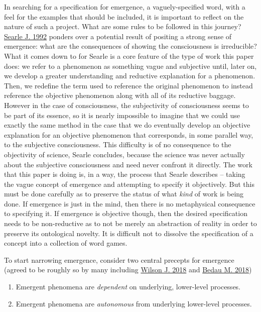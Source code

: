 \documentclass{article}
\newcommand{\ti}[1]{\textit{#1}}
\renewcommand{\cite}[1]{\hyperlink{#1}{#1}}
\begin{document}
In searching for a specification for emergence, a vaguely-specified word, with a feel for the examples that should be included, it is important to reflect on the nature of such a project. What are some rules to be followed in this journey? \cite{Searle J. 1992} ponders over a potential result of positing a strong sense of emergence: what are the consequences of showing the consciousness is irreducible? What it comes down to for Searle is a core feature of the type of work this paper does: we refer to a phenomenon as something vague and subjective until, later on, we develop a greater understanding and reductive explanation for a phenomenon. Then, we redefine the term used to reference the original phenomenon to instead reference the objective phenomenon along with all of its reductive baggage. However in the case of consciousness, the subjectivity of consciousness seems to be part of its essence, so it is nearly impossible to imagine that we could use exactly the same method in the case that we do eventually develop an objective explanation for an objective phenomenon that corresponds, in some parallel way, to the subjective consciousness. This difficulty is of no consequence to the objectivity of science, Searle concludes, because the science was never actually about the subjective consciousness and need never confront it directly. The work that this paper is doing is, in a way, the process that Searle describes -- taking the vague concept of emergence and attempting to specify it objectively. But this must be done carefully as to preserve the status of what \ti{kind} of work is being done. If emergence is just in the mind, then there is no metaphysical consequence to specifying it. If emergence is objective though, then the desired specification needs to be non-reductive as to not be merely an abstraction of reality in order to preserve its ontological novelty. It is difficult not to dissolve the specification of a concept into a collection of word games.

To start narrowing emergence, consider two central precepts for emergence (agreed to be roughly so by many including \cite{Wilson J. 2018} and \cite{Bedau M. 2018})

\begin{enumerate}
\item Emergent phenomena are \ti{dependent} on underlying, lower-level processes.
\item Emergent phenomena are \ti{autonomous} from underlying lower-level processes.
\end{enumerate}
\end{document}
